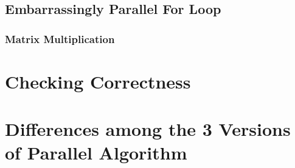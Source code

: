 \documentclass{article}
\newcommand{\cpp}{\lstinline[language=C++]}
\begin{document}
    \subsection{Embarrassingly Parallel For Loop}
    
    \subsubsection{Matrix Multiplication}
     
    
     \section{Checking Correctness}
    
    \clearpage
    
    \section{Differences among the 3 Versions of Parallel Algorithm}
    
\end{document}
